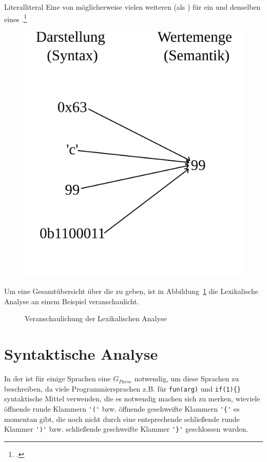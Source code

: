 \begin{Definition}{Literal}{literal}
  Eine von möglicherweise vielen weiteren  (als ) für ein und denselben  eines .\footcite{thiemann_einfuhrung_2018}
  \begin{figure}[H]
    \centering
    \includegraphics[width=0.33\linewidth]{./figures/literal.png}
  \end{figure}
\end{Definition}

Um eine Gesamtübersicht über die  zu geben, ist in Abbildung~\ref{fig:lexikalische_analyse_veranschaulichung} die Lexikalische Analyse an einem Beispiel veranschaulicht.

\begin{figure}[H]
  \hfill

  \caption{Veranschaulichung der Lexikalischen Analyse}
  \label{fig:lexikalische_analyse_veranschaulichung}
\end{figure}

\section{Syntaktische Analyse}
In der  ist für einige Sprachen eine  $G_{Parse}$ notwendig, um diese Sprachen zu beschreiben, da viele Programmiersprachen z.B. für  \verb|fun(arg)| und  \verb|if(1){}| syntaktische Mittel verwenden, die es notwendig machen sich zu merken, wieviele öffnende runde Klammern \verb|'('| bzw. öffnende geschweifte Klammern \verb|'{'| es momentan gibt, die noch nicht durch eine entsprechende schließende runde Klammer \verb|')'| bzw. schließende geschweifte Klammer \verb|'}'| geschlossen wurden.

